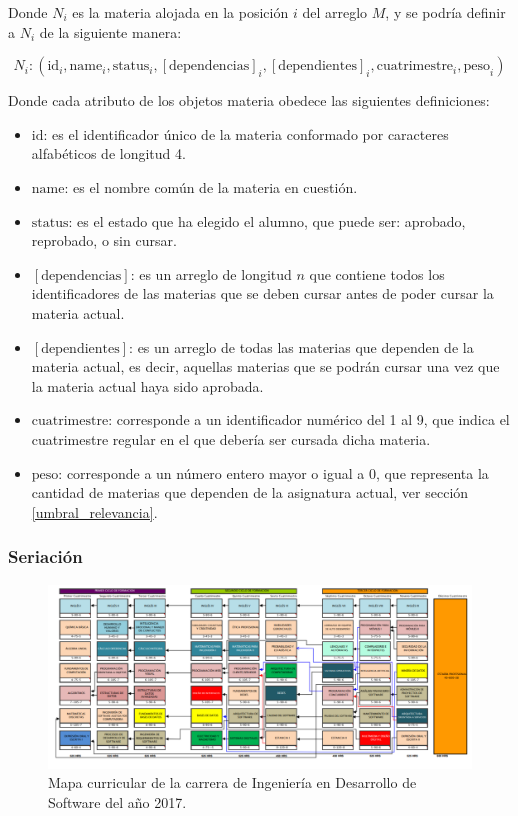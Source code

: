 \noindent
Donde \( N_i \) es la materia alojada en la posición \( i \) del arreglo \( M \), y se podría definir a \( N_i \) de la siguiente manera: %

\begin{equation}
    N_i : (\text{id}_i, \text{name}_i, \text{status}_i, [\text{dependencias}]_i, [\text{dependientes}]_i, \text{cuatrimestre}_i,  \text{peso}_i)
    \label{eq:atributos_materia}
\end{equation} 

\noindent
Donde cada atributo de los objetos materia obedece las siguientes definiciones:
\begin{itemize}
    \item \( \text{id} \): es el identificador único de la materia conformado por caracteres alfabéticos de longitud 4.
    \item \( \text{name} \): es el nombre común de la materia en cuestión.
    \item \( \text{status} \): es el estado que ha elegido el alumno, que puede ser: aprobado, reprobado, o sin cursar.
    \item \( [\text{dependencias}] \): es un arreglo de longitud \( n \) que contiene todos los identificadores de las materias que se deben cursar antes de poder cursar la materia actual.
    \item \( [\text{dependientes}] \): es un arreglo de todas las materias que dependen de la materia actual, es decir, aquellas materias que se podrán cursar una vez que la materia actual haya sido aprobada.
    \item \( \text{cuatrimestre} \): corresponde a un identificador numérico del 1 al 9, que indica el cuatrimestre regular en el que debería ser cursada dicha materia.
    \item \( \text{peso} \): corresponde a un número entero mayor o igual a 0, que representa la cantidad de materias que dependen de la asignatura actual, ver sección \ref{umbral_relevancia}.
\end{itemize}


\subsubsection{Seriación}

\begin{figure}[h]
    \centering
    \includegraphics[width=\textwidth]{images/mapa_curricular.png}
    \caption{Mapa curricular de la carrera de Ingeniería en Desarrollo de Software del año 2017.}
    \label{fig:mapa_curricular_ids_2017}
\end{figure}

